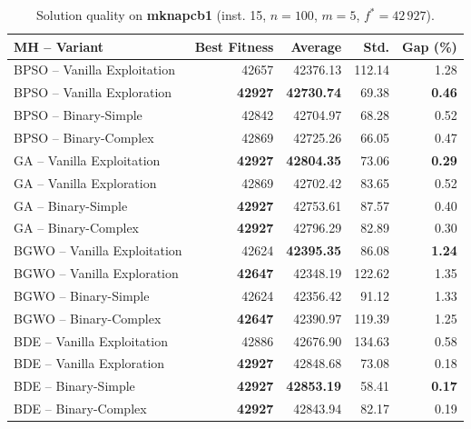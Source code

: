 \begin{table}[htbp]
  \centering
  \small
  \caption{Solution quality on \textbf{mknapcb1} (inst. 15, $n=100$, $m=5$, $f^*=42\,927$).}
  \label{tab:calidad_mknapcb1_15}
  \begin{tabular}{lrrrr}
    \toprule
    \textbf{MH -- Variant} &
    \textbf{Best Fitness} &
    \textbf{Average} &
    \textbf{Std.} &
    \textbf{Gap (\%)} \\
    \midrule
    BPSO -- Vanilla Exploitation &          42657 &         42376.13 & 112.14 &         1.28 \\
    BPSO -- Vanilla Exploration  & \textbf{42927} & \textbf{42730.74} &  69.38 & \textbf{0.46} \\
    BPSO -- Binary-Simple        &          42842 &         42704.97 &  68.28 &         0.52 \\
    BPSO -- Binary-Complex       &          42869 &         42725.26 &  66.05 &         0.47 \\
    \midrule
    GA -- Vanilla Exploitation   & \textbf{42927} & \textbf{42804.35} &  73.06 & \textbf{0.29} \\
    GA -- Vanilla Exploration    &          42869 &         42702.42 &  83.65 &         0.52 \\
    GA -- Binary-Simple          & \textbf{42927} &         42753.61 &  87.57 &         0.40 \\
    GA -- Binary-Complex         & \textbf{42927} &         42796.29 &  82.89 &         0.30 \\
    \midrule
    BGWO -- Vanilla Exploitation &          42624 & \textbf{42395.35} &  86.08 & \textbf{1.24} \\
    BGWO -- Vanilla Exploration  & \textbf{42647} &         42348.19 & 122.62 &         1.35 \\
    BGWO -- Binary-Simple        &          42624 &         42356.42 &  91.12 &         1.33 \\
    BGWO -- Binary-Complex       & \textbf{42647} &         42390.97 & 119.39 &         1.25 \\
    \midrule
    BDE -- Vanilla Exploitation  &          42886 &         42676.90 & 134.63 &         0.58 \\
    BDE -- Vanilla Exploration   & \textbf{42927} &         42848.68 &  73.08 &         0.18 \\
    BDE -- Binary-Simple         & \textbf{42927} & \textbf{42853.19} &  58.41 & \textbf{0.17} \\
    BDE -- Binary-Complex        & \textbf{42927} &         42843.94 &  82.17 &         0.19 \\
    \bottomrule
  \end{tabular}
\end{table}
